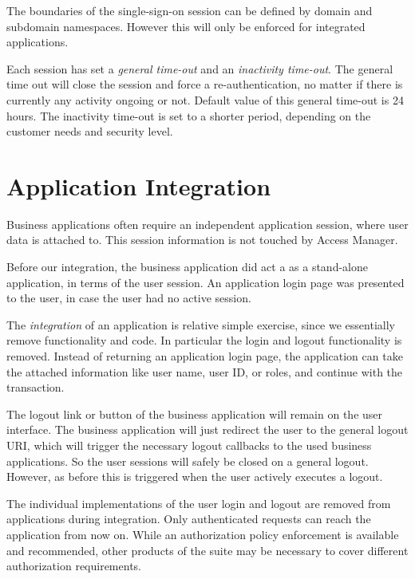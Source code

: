 \documentclass[11pt]{report}
\begin{document}
The boundaries of the single-sign-on session can be defined by domain
and subdomain namespaces. However this will only be enforced for
integrated applications.

Each session has set a \emph{general time-out} and an \emph{inactivity
time-out}. The general time out will close the session and force a
re-authentication, no matter if there is currently any activity ongoing
or not. Default value of this general time-out is 24 hours. The
inactivity time-out is set to a shorter period, depending on the
customer needs and security level.


\section{Application Integration}

Business applications often require an independent application session,
where user data is attached to. This session information is not touched
by Access Manager.

Before our integration, the business application did act a as a
stand-alone application, in terms of the user session. An application
login page was presented to the user, in case the user had no active
session.

The \emph{integration} of an application is relative simple exercise,
since we essentially remove functionality and code. In particular the
login and logout functionality is removed. Instead of returning an
application login page, the application can take the attached
information like user name, user ID, or roles, and continue with the
transaction.

The logout link or button of the business application will remain on the
user interface. The business application will just redirect the user to
the general logout URI, which will trigger the necessary logout
callbacks to the used business applications. So the user sessions will
safely be closed on a general logout. However, as before this is
triggered when the user actively executes a logout.

The individual implementations of the user login and logout are removed
from applications during integration. Only authenticated requests can
reach the application from now on. While an authorization policy
enforcement is available and recommended, other products of the suite
may be necessary to cover different authorization requirements.



\end{document}
